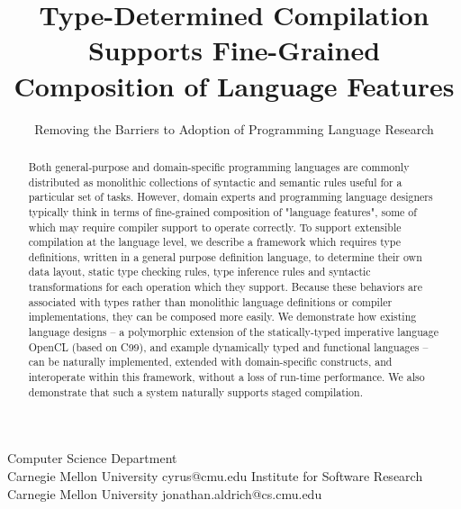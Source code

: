 \documentclass{sigplanconf}
\begin{document}
\copyrightdata{[to be supplied]} 


\title{Type-Determined Compilation Supports Fine-Grained Composition of Language Features}
\subtitle{Removing the Barriers to Adoption of Programming Language Research}

           {Computer Science Department\\
           Carnegie Mellon University}
           {cyrus@cmu.edu}
           {Institute for Software Research\\
           Carnegie Mellon University}
           {jonathan.aldrich@cs.cmu.edu}

\maketitle

\begin{abstract}
Both general-purpose and domain-specific programming languages are commonly distributed as monolithic collections of syntactic and semantic rules useful for a particular set of tasks. However, domain experts and programming language designers typically think in terms of fine-grained composition of "language features", some of which may require compiler support to operate correctly. To support extensible compilation at the language level, we describe a framework which requires type definitions, written in a general purpose definition language, to determine their own data layout, static type checking rules, type inference rules and syntactic transformations for each operation which they support. Because these behaviors are associated with types rather than monolithic language definitions or compiler implementations, they can be composed more easily. We demonstrate how existing language designs -- a polymorphic extension of the statically-typed imperative language OpenCL (based on C99), and example dynamically typed and functional languages -- can be naturally implemented, extended with domain-specific constructs, and interoperate within this framework, without a loss of run-time performance. We also demonstrate that such a system naturally supports staged compilation.
\end{abstract}

\end{document}
